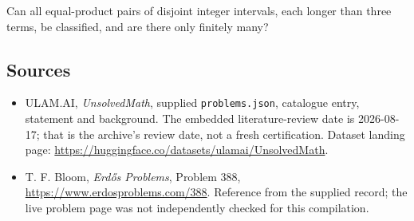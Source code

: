 \documentclass[11pt,a4paper]{article}
\begin{document}
Can all equal-product pairs of disjoint integer intervals, each longer than three terms, be classified, and are there only finitely many?

\subsection{Sources}

{\small

\begin{itemize}

\item[\hypertarget{source:statement:1}{S1}] ULAM.AI, \emph{UnsolvedMath}, supplied \texttt{problems.json}, catalogue entry, statement and background. The embedded literature-review date is 2026-08-17; that is the archive’s review date, not a fresh certification. Dataset landing page: \url{https://huggingface.co/datasets/ulamai/UnsolvedMath}.

\item[\hypertarget{source:statement:2}{S2}] T. F. Bloom, \emph{Erdős Problems}, Problem 388, \url{https://www.erdosproblems.com/388}. Reference from the supplied record; the live problem page was not independently checked for this compilation.

\end{itemize}

}

\label{end:statement}
\end{document}
